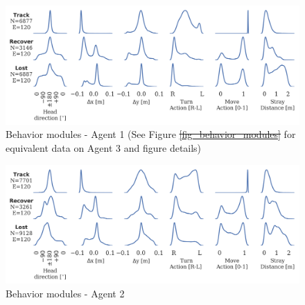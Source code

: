 \documentclass[5p,twocolumn,authoryear]{elsarticle}
\providecommand{\DIFaddtex}[1]{{\protect\color{blue}\uwave{#1}}} %
\providecommand{\DIFdeltex}[1]{{\protect\color{red}\sout{#1}}}                      %
\providecommand{\DIFaddFL}[1]{\DIFadd{#1}} %
\providecommand{\DIFdelFL}[1]{\DIFdel{#1}} %
\providecommand{\DIFaddbeginFL}{} %
\providecommand{\DIFaddendFL}{} %
\providecommand{\DIFdelbeginFL}{} %
\providecommand{\DIFdelendFL}{} %
\providecommand{\DIFadd}[1]{\texorpdfstring{\DIFaddtex{#1}}{#1}} %
\providecommand{\DIFdel}[1]{\texorpdfstring{\DIFdeltex{#1}}{}} %
\newcommand{\DIFscaledelfig}{0.5}
\newlength{\DIFdelgraphicswidth} %
\newlength{\DIFdelgraphicsheight} %
\newcommand{\DIFaddincludegraphics}[2][]{{\color{blue}\fbox{\DIFOincludegraphics[#1]{#2}}}} %
\newcommand{\DIFdelincludegraphics}[2][]{%
\sbox{\DIFdelgraphicsbox}{\DIFOincludegraphics[#1]{#2}}%
\settoboxwidth{\DIFdelgraphicswidth}{\DIFdelgraphicsbox} %
\settoboxtotalheight{\DIFdelgraphicsheight}{\DIFdelgraphicsbox} %
\scalebox{\DIFscaledelfig}{%
\parbox[b]{\DIFdelgraphicswidth}{\usebox{\DIFdelgraphicsbox}\\[-\baselineskip] \rule{\DIFdelgraphicswidth}{0em}}\llap{\resizebox{\DIFdelgraphicswidth}{\DIFdelgraphicsheight}{%
\setlength{\unitlength}{\DIFdelgraphicswidth}%
\begin{picture}(1,1)%
\thicklines\linethickness{2pt} %
{\color[rgb]{1,0,0}\put(0,0){\framebox(1,1){}}}%
{\color[rgb]{1,0,0}\put(0,0){\line( 1,1){1}}}%
{\color[rgb]{1,0,0}\put(0,1){\line(1,-1){1}}}%
\end{picture}%
}\hspace*{3pt}}} %
} %
\DeclareRobustCommand{\DIFaddbeginFL}{\DIFOaddbeginFL \let\includegraphics\DIFaddincludegraphics} %
\DeclareRobustCommand{\DIFaddendFL}{\DIFOaddendFL \let\includegraphics\DIFOincludegraphics} %
\DeclareRobustCommand{\DIFdelbeginFL}{\DIFOdelbeginFL \let\includegraphics\DIFdelincludegraphics} %
\DeclareRobustCommand{\DIFdelendFL}{\DIFOaddendFL \let\includegraphics\DIFOincludegraphics} %
\begin{document}

\begin{figure}[h!]
\centering
\includegraphics[width=0.85\linewidth]{regime_histos_2760377.png}
\caption[Behavior modules - Agent 1]{Behavior modules - Agent 1 (See Figure \DIFdelbeginFL \DIFdelFL{\ref{fig_behavior_modules} }\DIFdelendFL \DIFaddbeginFL \DIFaddFL{\ref{fig_regimes_coursedir} }\DIFaddendFL for equivalent data on Agent 3 and figure details)}
\end{figure}

\begin{figure}[h!]
\centering
\includegraphics[width=0.85\linewidth]{regime_histos_3199993.png}
\caption[Behavior modules - Agent 2]{Behavior modules - Agent 2}
\end{figure}
\end{document}
